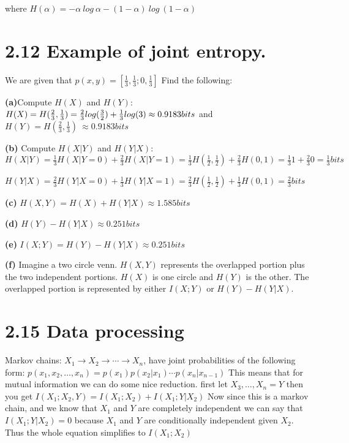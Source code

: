 \documentclass[10pt]{article}
\begin{document}
\begin{tiny}
\begin{multicols}{3}
where 
\(H(\alpha) = -\alpha\ log\ \alpha - (1 - \alpha )\ log\ (1-\alpha)\)
             
\section*{2.12 Example of joint entropy.}
We are given that  \( p(x,y)=\left[ \frac{1}{3},\frac{1}{3};0,\frac{1}{3} \right] \) Find the following:

\textbf{(a)}Compute  \(H(X)\) and \( H(Y)\):~~
\(
H(X) = H(\frac{2}{3},\frac{1}{3})
= \frac{2}{3} log(\frac{3}{2}) + \frac{1}{3}log(3)\\
\approx 0.9183 bits \) and \(
H(Y) =  H(\frac{2}{3},\frac{1}{3})\
\approx 0.9183 bits
\)
              
\textbf{(b)} Compute \(H(X|Y)\) and \(H(Y|X)\):~~
\(
H(X|Y) = \frac{1}{3}H(X|Y=0) + \frac{2}{3}H(X|Y=1)
=\frac{1}{3}H(\frac{1}{2},\frac {1}{2})+\frac{2}{3}H(0,1)
=\frac{1}{3}1+\frac{2}{3}0 
= \frac{1}{3} bits \) 
                
\(
H(Y|X) = \frac{2}{3}H(Y|X=0)+\frac{1}{3}H(Y|X=1)
=\frac{2}{3}H(\frac{1}{2},\frac{1}{2}) + \frac{1}{3}H(0,1)
=\frac{2}{3} bits
\)
              
\textbf{(c)}
\(
H(X,Y)=H(X)+H(Y|X)
\approx 1.585 bits
\)
          	  
\textbf{(d)} \(H(Y) - H(Y|X) \approx 0.251 bits\)
            	
\textbf{(e)} \( I(X;Y) =H(Y) - H(Y|X) \approx 0.251 bits
\)
		
\textbf{(f)}  Imagine a two circle venn. $H(X,Y)$ represents the overlapped portion plus the two independent portions. $H(X)$ is one circle and $H(Y)$ is the other. The overlapped portion is represented by either $I(X;Y)$ or $H(Y)-H(Y|X)$.
          
\section*{2.15 Data processing} Markov chains: $X_{1}\rightarrow X_{2}\rightarrow \cdots \rightarrow X_{n}$, have joint probabilities of the following form: 
\(
p(x_{1},x_{2},\ldots,x_{n})=p(x_{1})p(x_{2}|x_{1})\cdots p(x_{n}|x_{n-1})
\)
This means that for mutual information we can do some nice reduction.
first let \( X_{3},\ldots,X_{n} = Y\) then you get \(
I(X_{1};X_{2},Y) = I(X_{1};X_{2})+I(X_{1};Y|X_{2})  \)
Now since this is a markov chain, and we know that $X_{1}$ and $Y$ are completely independent
we can say that $I(X_{1};Y|X_{2})=0$ because $X_1$ and $Y$ are conditionally independent given $X_2$. 
Thus the whole equation simplifies to $I(X_{1};X_{2})$


\end{multicols}
\end{tiny}
\end{document}
